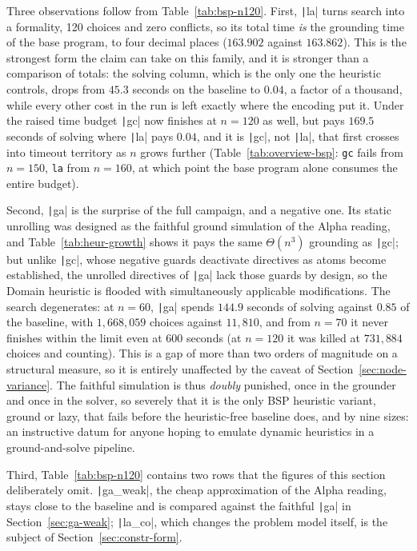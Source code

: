 Three observations follow from Table~\ref{tab:bsp-n120}. First, \texttt|la| turns search into a formality, 120 choices and zero conflicts, so its total time \emph{is} the grounding time of the base program, to four decimal places ($163.902$ against $163.862$). This is the strongest form the claim can take on this family, and it is stronger than a comparison of totals: the solving column, which is the only one the heuristic controls, drops from $45.3$ seconds on the baseline to $0.04$, a factor of a thousand, while every other cost in the run is left exactly where the encoding put it. Under the raised time budget \texttt|gc| now finishes at $n=120$ as well, but pays $169.5$ seconds of solving where \texttt|la| pays $0.04$, and it is \texttt|gc|, not \texttt|la|, that first crosses into timeout territory as $n$ grows further (Table~\ref{tab:overview-bsp}: \texttt{gc} fails from $n=150$, \texttt{la} from $n=160$, at which point the base program alone consumes the entire budget).

Second, \texttt|ga| is the surprise of the full campaign, and a negative one. Its static unrolling was designed as the faithful ground simulation of the Alpha reading, and Table~\ref{tab:heur-growth} shows it pays the same $\Theta(n^3)$ grounding as \texttt|gc|; but unlike \texttt|gc|, whose negative guards deactivate directives as atoms become established, the unrolled directives of \texttt|ga| lack those guards by design, so the Domain heuristic is flooded with simultaneously applicable modifications. The search degenerates: at $n=60$, \texttt|ga| spends $144.9$ seconds of solving against $0.85$ of the baseline, with $1{,}668{,}059$ choices against $11{,}810$, and from $n=70$ it never finishes within the limit even at 600 seconds (at $n=120$ it was killed at $731{,}884$ choices and counting). This is a gap of more than two orders of magnitude on a structural measure, so it is entirely unaffected by the caveat of Section~\ref{sec:node-variance}. The faithful simulation is thus \emph{doubly} punished, once in the grounder and once in the solver, so severely that it is the only BSP heuristic variant, ground or lazy, that fails before the heuristic-free baseline does, and by nine sizes: an instructive datum for anyone hoping to emulate dynamic heuristics in a ground-and-solve pipeline.

Third, Table~\ref{tab:bsp-n120} contains two rows that the figures of this section deliberately omit. \texttt|ga_weak|, the cheap approximation of the Alpha reading, stays close to the baseline and is compared against the faithful \texttt|ga| in Section~\ref{sec:ga-weak}; \texttt|la_co|, which changes the problem model itself, is the subject of Section~\ref{sec:constr-form}.

